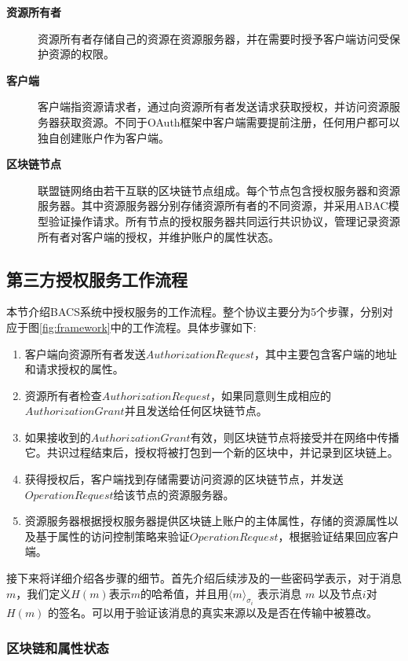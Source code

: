 \begin{description}
  \item[\textbf{资源所有者}] 资源所有者存储自己的资源在资源服务器，并在需要时授予客户端访问受保护资源的权限。
  \item[\textbf{客户端}] 客户端指资源请求者，通过向资源所有者发送请求获取授权，并访问资源服务器获取资源。不同于OAuth框架中客户端需要提前注册，任何用户都可以独自创建账户作为客户端。
  \item[\textbf{区块链节点}] 联盟链网络由若干互联的区块链节点组成。每个节点包含授权服务器和资源服务器。其中资源服务器分别存储资源所有者的不同资源，并采用ABAC模型验证操作请求。所有节点的授权服务器共同运行共识协议，管理记录资源所有者对客户端的授权，并维护账户的属性状态。
\end{description}

\subsection{第三方授权服务工作流程}
\label{sec:protocols}
本节介绍BACS系统中授权服务的工作流程。整个协议主要分为5个步骤，分别对应于图\ref{fig:framework}中的工作流程。具体步骤如下:

\begin{enumerate}
  \item 客户端向资源所有者发送$Authorization Request$，其中主要包含客户端的地址和请求授权的属性。
  \item 资源所有者检查$Authorization Request$，如果同意则生成相应的$Authorization Grant$并且发送给任何区块链节点。
  \item 如果接收到的$Authorization Grant$有效，则区块链节点将接受并在网络中传播它。共识过程结束后，授权将被打包到一个新的区块中，并记录到区块链上。
  \item 获得授权后，客户端找到存储需要访问资源的区块链节点，并发送$Operation Request$给该节点的资源服务器。
  \item 资源服务器根据授权服务器提供区块链上账户的主体属性，存储的资源属性以及基于属性的访问控制策略来验证$Operation Request$，根据验证结果回应客户端。
\end{enumerate}

接下来将详细介绍各步骤的细节。首先介绍后续涉及的一些密码学表示，对于消息$m$，我们定义$H(m)$表示$m$的哈希值，并且用$\langle m \rangle_{\sigma_{i}}$ 表示消息 $m$ 以及节点$i$对 $H(m)$ 的签名。可以用于验证该消息的真实来源以及是否在传输中被篡改。

\subsubsection{区块链和属性状态}

